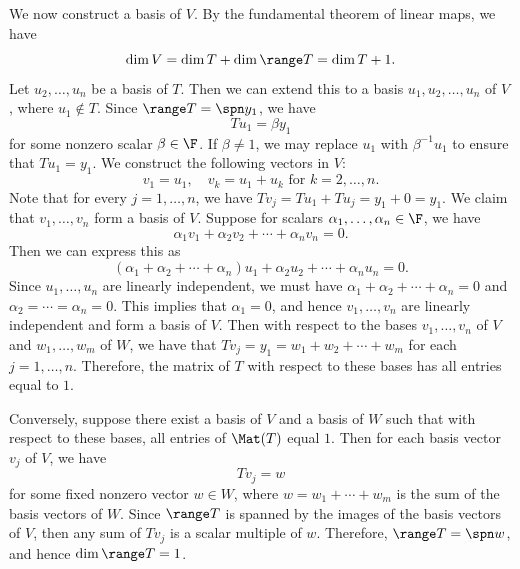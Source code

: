 \begin{exc}
\begin{solution}
We now construct a basis of $V$. By the fundamental theorem of linear maps, we
have
\[ \dim V = \dim T+\dim\range T = \dim T+1. \]
Let $u_2,\dots,u_n$ be a basis of $T$. Then we can extend this to a basis
$u_1,u_2,\dots,u_n$ of $V$, where $u_1\notin T$. Since $\range T=\spn y_1$, we
have
\[ Tu_1 = \beta y_1 \]
for some nonzero scalar $\beta\in\F$. If $\beta\ne1$, we may replace $u_1$ with
$\beta^{-1}u_1$ to ensure that $Tu_1=y_1$. We construct the following vectors
in $V$:
\[ v_1 = u_1, \quad v_k = u_1+u_k \text{ for } k=2,\dots,n. \]
Note that for every $j=1,\dots,n$, we have $Tv_j=Tu_1+Tu_j=y_1+0=y_1$. We
claim that $v_1,\dots,v_n$ form a basis of $V$. Suppose for scalars
$\alpha_1,\dots,\alpha_n\in\F$, we have
\[ \alpha_1v_1+\alpha_2v_2+\cdots+\alpha_nv_n = 0. \]
Then we can express this as
\[ (\alpha_1+\alpha_2+\cdots+\alpha_n)u_1+\alpha_2u_2+\cdots+\alpha_nu_n = 0. \]
Since $u_1,\dots,u_n$ are linearly independent, we must have
$\alpha_1+\alpha_2+\cdots+\alpha_n=0$ and $\alpha_2=\cdots=\alpha_n=0$. This
implies that $\alpha_1=0$, and hence $v_1,\dots,v_n$ are linearly independent
and form a basis of $V$. Then with respect to the bases $v_1,\dots,v_n$ of $V$
and $w_1,\dots,w_m$ of $W$, we have that $Tv_j=y_1=w_1+w_2+\cdots+w_m$ for each
$j=1,\dots,n$. Therefore, the matrix of $T$ with respect to these bases has all
entries equal to $1$.

Conversely, suppose there exist a basis of $V$ and a basis of $W$ such that
with respect to these bases, all entries of $\Mat(T)$ equal $1$. Then for each
basis vector $v_j$ of $V$, we have
\[ Tv_j = w \]
for some fixed nonzero vector $w\in W$, where $w=w_1+\cdots+w_m$ is the sum of
the basis vectors of $W$. Since $\range T$ is spanned by the images of the basis
vectors of $V$, then any sum of $Tv_j$ is a scalar multiple of $w$. Therefore,
$\range T=\spn w$, and hence $\dim\range T=1$.
\end{solution}


\end{exc}
